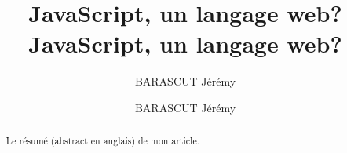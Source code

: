 \documentclass[a4paper,12pt]{report}
\title{JavaScript, un langage web?}
\author{\textsc{BARASCUT} Jérémy}
\date{} %
\title{JavaScript, un langage web?}
\date{}
\author{BARASCUT Jérémy}
\begin{document}
 
\maketitle
 
\begin{abstract}
Le résumé (abstract en anglais) de mon article.
\end{abstract}


 
 
\tableofcontents

% 


























 
 
\printindex
\end{document}
